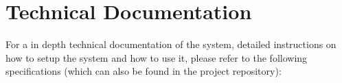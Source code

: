 \documentclass{article}
\begin{document}
\section{Technical Documentation}
For a in depth technical documentation of the system, detailed 
instructions on how to setup the system and how to use it, please refer to the following specifications
(which can also be found in the project repository):



% 
% 
% 
\end{document}
